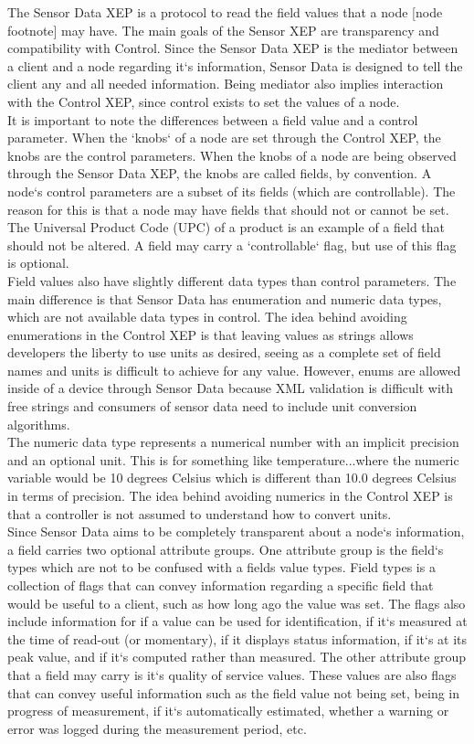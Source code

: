 The Sensor Data XEP is a protocol to read the field values that a node [node footnote] may have. The main goals of the Sensor XEP are transparency and compatibility with Control. Since the Sensor Data XEP is the mediator between a client and a node regarding it`s information, Sensor Data is designed to tell the client any and all needed information. Being mediator also implies interaction with the Control XEP, since control exists to set the values of a node.\\
It is important to note the differences between a field value and a control parameter. When the `knobs` of a node are set through the Control XEP, the knobs are the control parameters. When the knobs of a node are being observed through the Sensor Data XEP, the knobs are called fields, by convention. A node`s control parameters are a subset of its fields (which are controllable). The reason for this is that a node may have fields that should not or cannot be set. The Universal Product Code (UPC) of a product is an example of a field that should not be altered. A field may carry a `controllable` flag, but use of this flag is optional. \\
Field values also have slightly different data types than control parameters. The main difference is that Sensor Data has enumeration and numeric data types, which are not available data types in control. The idea behind avoiding enumerations in the Control XEP is that leaving values as strings allows developers the liberty to use units as desired, seeing as a complete set of field names and units is difficult to achieve for any value. However, enums are allowed inside of a device through Sensor Data because XML validation is difficult with free strings and consumers of sensor data need to include unit conversion algorithms. \\
The numeric data type represents a numerical number with an implicit precision and an optional unit. This is for something like temperature...where the numeric variable would be 10 degrees Celsius which is different than 10.0 degrees Celsius in terms of precision. The idea behind avoiding numerics in the Control XEP is that a controller is not assumed to understand how to convert units. \\
Since Sensor Data aims to be completely transparent about a node`s information, a field carries two optional attribute groups. One attribute group is the field`s types which are not to be confused with a fields value types. Field types is a collection of flags that can convey information regarding a specific field that would be useful to a client, such as how long ago the value was set. The flags also include information for if a value can be used for identification, if it`s measured at the time of read-out (or momentary), if it displays status information, if it`s at its peak value, and if it`s computed rather than measured. The other attribute group that a field may carry is it`s quality of service values. These values are also flags that can convey useful information such as the field value not being set, being in progress of measurement, if it`s automatically estimated, whether a warning or error was logged during the measurement period, etc.\\
